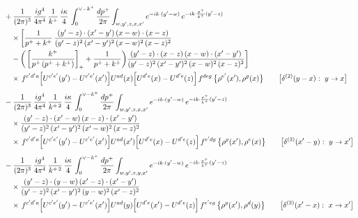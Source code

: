 \documentclass[9pt]{article}
\numberwithin{equation}{section}
\begin{document}
\begin{align}
&+\frac{1}{(2\pi)^{3}}\,\frac{ig^{4}}{4\pi^{4}}\,\frac{1}{k^{+}}\,\frac{i\kappa}{4}\,\int_{0}^{\vee-k^{+}}\frac{dp^{+}}{2\pi}\int_{w,y^{\prime},z,x,x^{\prime}}e^{-ik\cdot(y^{\prime}-w)}\,e^{-ik\cdot\frac{p^{+}}{k^{+}}(y^{\prime}-z)}\notag\\&\quad\times\bigg[\frac{1}{p^{+}+k^{+}}\,\frac{(y^{\prime}-z)\cdot(x^{\prime}-y^{\prime})\,(x-w)\cdot(x-z)}{(y^{\prime}-z)^{2}\,(x^{\prime}-y^{\prime})^{2}\,(x-w)^{2}\,(x-z)^{2}}\notag\\
&\quad -\bigg(\left[\frac{k^{+}}{p^{+}\,(p^{+}+k^{+})}\right]_{+}+\frac{1}{p^{+}+k^{+}}\bigg)\frac{(y^{\prime}-z)\cdot(x-z)\,(x-w)\cdot(x^{\prime}-y^{\prime})}{(y^{\prime}-z)^{2}\,(x^{\prime}-y^{\prime})^{2}\,(x-w)^{2}\,(x-z)^{2}}\bigg]\notag\\&\quad\times\,f^{c^{\prime}d^{\prime}a}\Big[U^{c^{\prime}e^{\prime}}(y^{\prime})-U^{c^{\prime}e^{\prime}}(x^{\prime})\Big]U^{ad}(x)\Big[U^{d^{\prime}e}(x)-U^{d^{\prime}e}(z)\Big]\,f^{deg}\,\big\{\rho^{e^{\prime}}(x^{\prime}),\rho^{g}(x)\big\}\qquad\big[\delta^{(2)}(y-x):\ y\to x\big]\notag\\[4pt]
&-\frac{1}{(2\pi)^{3}}\,\frac{ig^{4}}{4\pi^{4}}\,\frac{1}{k^{+\,2}}\,\frac{i\kappa}{4}\,\int_{0}^{\vee-k^{+}}\frac{dp^{+}}{2\pi}\int_{w,y^{\prime},z,x,x^{\prime}}e^{-ik\cdot(y^{\prime}-w)}\,e^{-ik\cdot\frac{p^{+}}{k^{+}}(y^{\prime}-z)}\notag\\&\quad\times\frac{(y^{\prime}-z)\cdot(x^{\prime}-w)\,(x-z)\cdot(x^{\prime}-y^{\prime})}{(y^{\prime}-z)^{2}\,(x^{\prime}-y^{\prime})^{2}\,(x^{\prime}-w)^{2}\,(x-z)^{2}}\notag\\&\quad\times\,f^{c^{\prime}d^{\prime}a}\Big[U^{c^{\prime}e^{\prime}}(y^{\prime})-U^{c^{\prime}e^{\prime}}(x^{\prime})\Big]U^{ad}(x^{\prime})\Big[U^{d^{\prime}e}(x)-U^{d^{\prime}e}(z)\Big]\,f^{e^{\prime}dg}\,\big\{\rho^{g}(x^{\prime}),\rho^{e}(x)\big\}\qquad\big[\delta^{(2)}(x^{\prime}-y):\ y\to x^{\prime}\big]\notag\\[4pt]
&-\frac{1}{(2\pi)^{3}}\,\frac{ig^{4}}{4\pi^{4}}\,\frac{1}{k^{+\,2}}\,\frac{i\kappa}{4}\,\int_{0}^{\vee-k^{+}}\frac{dp^{+}}{2\pi}\int_{w,y^{\prime},z,y,x^{\prime}}e^{-ik\cdot(y^{\prime}-w)}\,e^{-ik\cdot\frac{p^{+}}{k^{+}}(y^{\prime}-z)}\notag\\&\quad\times\frac{(y^{\prime}-z)\cdot(y-w)\,(x^{\prime}-z)\cdot(x^{\prime}-y^{\prime})}{(y^{\prime}-z)^{2}\,(x^{\prime}-y^{\prime})^{2}\,(y-w)^{2}\,(x^{\prime}-z)^{2}}\notag\\&\quad\times\,f^{c^{\prime}d^{\prime}a}\Big[U^{c^{\prime}e^{\prime}}(y^{\prime})-U^{c^{\prime}e^{\prime}}(x^{\prime})\Big]U^{ad}(y)\Big[U^{d^{\prime}e}(x^{\prime})-U^{d^{\prime}e}(z)\Big]\,f^{e^{\prime}eg}\,\big\{\rho^{g}(x^{\prime}),\rho^{d}(y)\big\}\qquad\big[\delta^{(2)}(x^{\prime}-x):\ x\to x^{\prime}\big]\notag\\[4pt]

\end{align}
\end{document}
